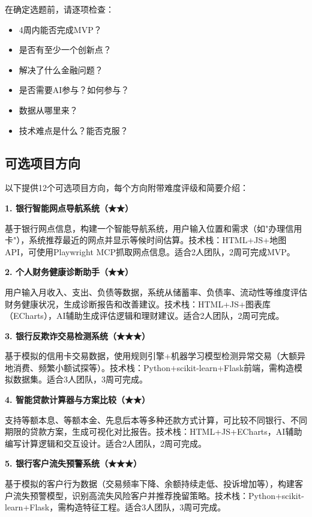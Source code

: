 \begin{notebox}[选题自查清单]
在确定选题前，请逐项检查：
\begin{itemize}[leftmargin=1em]
  \item [\checkmark] 4周内能否完成MVP？
  \item [\checkmark] 是否有至少一个创新点？
  \item [\checkmark] 解决了什么金融问题？
  \item [\checkmark] 是否需要AI参与？如何参与？
  \item [\checkmark] 数据从哪里来？
  \item [\checkmark] 技术难点是什么？能否克服？
\end{itemize}
\end{notebox}

\subsection{可选项目方向}

以下提供12个可选项目方向，每个方向附带难度评级和简要介绍：

\textbf{1. 银行智能网点导航系统（★★）}

基于银行网点信息，构建一个智能导航系统，用户输入位置和需求（如"办理信用卡"），系统推荐最近的网点并显示等候时间估算。技术栈：HTML+JS+地图API，可使用Playwright MCP抓取网点信息。适合2人团队，2周可完成MVP。

\textbf{2. 个人财务健康诊断助手（★★）}

用户输入月收入、支出、负债等数据，系统从储蓄率、负债率、流动性等维度评估财务健康状况，生成诊断报告和改善建议。技术栈：HTML+JS+图表库（ECharts），AI辅助生成评估逻辑和理财建议。适合2人团队，2周可完成。

\textbf{3. 银行反欺诈交易检测系统（★★★）}

基于模拟的信用卡交易数据，使用规则引擎+机器学习模型检测异常交易（大额异地消费、频繁小额试探等）。技术栈：Python+scikit-learn+Flask前端，需构造模拟数据集。适合3人团队，3周可完成。

\textbf{4. 智能贷款计算器与方案比较（★★）}

支持等额本息、等额本金、先息后本等多种还款方式计算，可比较不同银行、不同期限的贷款方案，生成可视化对比报告。技术栈：HTML+JS+ECharts，AI辅助编写计算逻辑和交互设计。适合2人团队，2周可完成。

\textbf{5. 银行客户流失预警系统（★★★）}

基于模拟的客户行为数据（交易频率下降、余额持续走低、投诉增加等），构建客户流失预警模型，识别高流失风险客户并推荐挽留策略。技术栈：Python+scikit-learn+Flask，需构造特征工程。适合3人团队，3周可完成。

